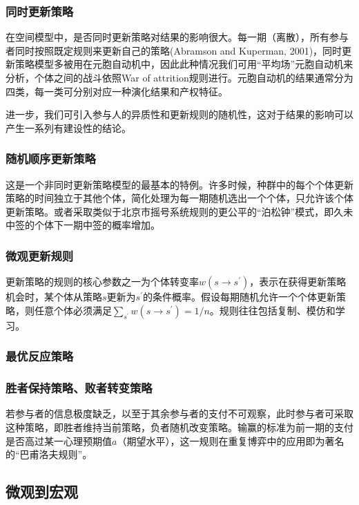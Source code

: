 \documentclass[lang=cn,12pt,a4paper]{elegantpaper}
\begin{document}
\subsubsection{同时更新策略}

在空间模型中，是否同时更新策略对结果的影响很大。每一期（离散），所有参与者同时按照既定规则来更新自己的策略(Abramson and Kuperman, 2001)，同时更新策略模型多被用在元胞自动机中，因此此种情况我们可用“平均场”元胞自动机来分析，个体之间的战斗依照War of attrition规则进行。元胞自动机的结果通常分为四类，每一类可分别对应一种演化结果和产权特征。

进一步，我们可引入参与人的异质性和更新规则的随机性，这对于结果的影响可以产生一系列有建设性的结论。

\subsubsection{随机顺序更新策略}

这是一个非同时更新策略模型的最基本的特例。许多时候，种群中的每个个体更新策略的时间独立于其他个体，简化处理为每一期随机选出一个个体，只允许该个体更新策略。或者采取类似于北京市摇号系统规则的更公平的“泊松钟”模式，即久未中签的个体下一期中签的概率增加。

\subsubsection{微观更新规则}

更新策略的规则的核心参数之一为个体转变率$w(s\rightarrow s^\prime)$，表示在获得更新策略机会时，某个体从策略$s$更新为$s^\prime$的条件概率。假设每期随机允许一个个体更新策略，则任意个体必须满足$\sum_{s^\prime} w(s\rightarrow s^\prime)=1/n$。规则往往包括复制、模仿和学习。

\subsubsection{最优反应策略}

\subsubsection{胜者保持策略、败者转变策略}

若参与者的信息极度缺乏，以至于其余参与者的支付不可观察，此时参与者可采取这种策略，即胜者维持当前策略，负者随机改变策略。输赢的标准为前一期的支付是否高过某一心理预期值$a$（期望水平），这一规则在重复博弈中的应用即为著名的“巴甫洛夫规则”。

\subsection{微观到宏观}
\end{document}
